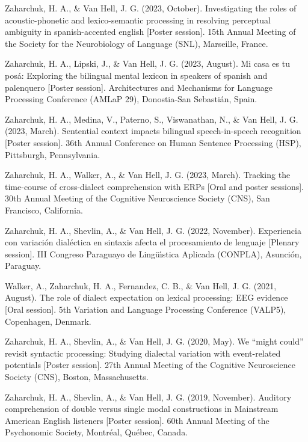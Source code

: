 \documentclass[11pt,a4paper,]{awesome-cv}
\begin{document}
\leavevmode{}%
Zaharchuk, H. A., \& Van Hell, J. G. (2023, October). Investigating the
roles of acoustic-phonetic and lexico-semantic processing in resolving
perceptual ambiguity in spanish-accented english {[}Poster session{]}.
15th Annual Meeting of the Society for the Neurobiology of Language
(SNL), Marseille, France.

\leavevmode{}%
Zaharchuk, H. A., Lipski, J., \& Van Hell, J. G. (2023, August). Mi casa
es tu posá: Exploring the bilingual mental lexicon in speakers of
spanish and palenquero {[}Poster session{]}. Architectures and
Mechanisms for Language Processing Conference (AMLaP 29), Donostia-San
Sebastián, Spain.

\leavevmode{}%
Zaharchuk, H. A., Medina, V., Paterno, S., Viswanathan, N., \& Van Hell,
J. G. (2023, March). Sentential context impacts bilingual
speech-in-speech recognition {[}Poster session{]}. 36th Annual
Conference on Human Sentence Processing (HSP), Pittsburgh, Pennsylvania.

\leavevmode{}%
Zaharchuk, H. A., Walker, A., \& Van Hell, J. G. (2023, March). Tracking
the time-course of cross-dialect comprehension with ERPs {[}Oral and
poster sessions{]}. 30th Annual Meeting of the Cognitive Neuroscience
Society (CNS), San Francisco, California.

\leavevmode{}%
Zaharchuk, H. A., Shevlin, A., \& Van Hell, J. G. (2022, November).
Experiencia con variación dialéctica en sintaxis afecta el procesamiento
de lenguaje {[}Plenary session{]}. III Congreso Paraguayo de Lingüı́stica
Aplicada (CONPLA), Asunción, Paraguay.

\leavevmode{}%
Walker, A., Zaharchuk, H. A., Fernandez, C. B., \& Van Hell, J. G.
(2021, August). The role of dialect expectation on lexical processing:
EEG evidence {[}Oral session{]}. 5th Variation and Language Processing
Conference (VALP5), Copenhagen, Denmark.

\leavevmode{}%
Zaharchuk, H. A., Shevlin, A., \& Van Hell, J. G. (2020, May). We
{``might could''} revisit syntactic processing: Studying dialectal
variation with event-related potentials {[}Poster session{]}. 27th
Annual Meeting of the Cognitive Neuroscience Society (CNS), Boston,
Massachusetts.

\leavevmode{}%
Zaharchuk, H. A., Shevlin, A., \& Van Hell, J. G. (2019, November).
Auditory comprehension of double versus single modal constructions in
Mainstream American English listeners {[}Poster session{]}. 60th Annual
Meeting of the Psychonomic Society, Montréal, Québec, Canada.
\end{document}
